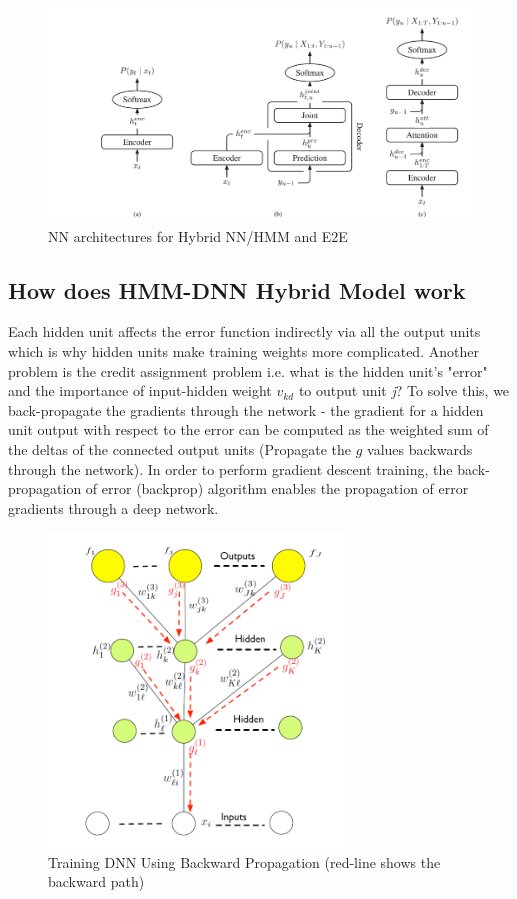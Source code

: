 \begin{figure}[h!]
    \centering
    \includegraphics[width=1.0\textwidth]{img/hybridande2e.png}
    \caption{NN architectures for Hybrid NN/HMM and E2E}
    \label{fig:hybrid-e2e}
\end{figure}

\subsection{How does HMM-DNN Hybrid Model work}

Each hidden unit affects the error function indirectly via all the output units which is why hidden units make training weights more complicated. Another problem is the credit assignment problem i.e. what is the hidden unit's "error" and the importance of input-hidden weight $v_{kd}$ to output unit \textit{j}? To solve this, we back-propagate the gradients through the network - the gradient for a hidden unit output with respect to the error can be computed as the weighted sum of the deltas of the connected output units (Propagate the $g$ values backwards through the network). In order to perform gradient descent training, the back-propagation of error (backprop) algorithm enables the propagation of error gradients through a deep network.

\begin{figure}[h!]
    \centering
    \includegraphics[width=0.7\textwidth]{img/DNN backdrop.png}
    \caption{Training DNN Using Backward Propagation (red-line shows the backward path)}
    \label{fig:dnn-backdrop}
\end{figure}

